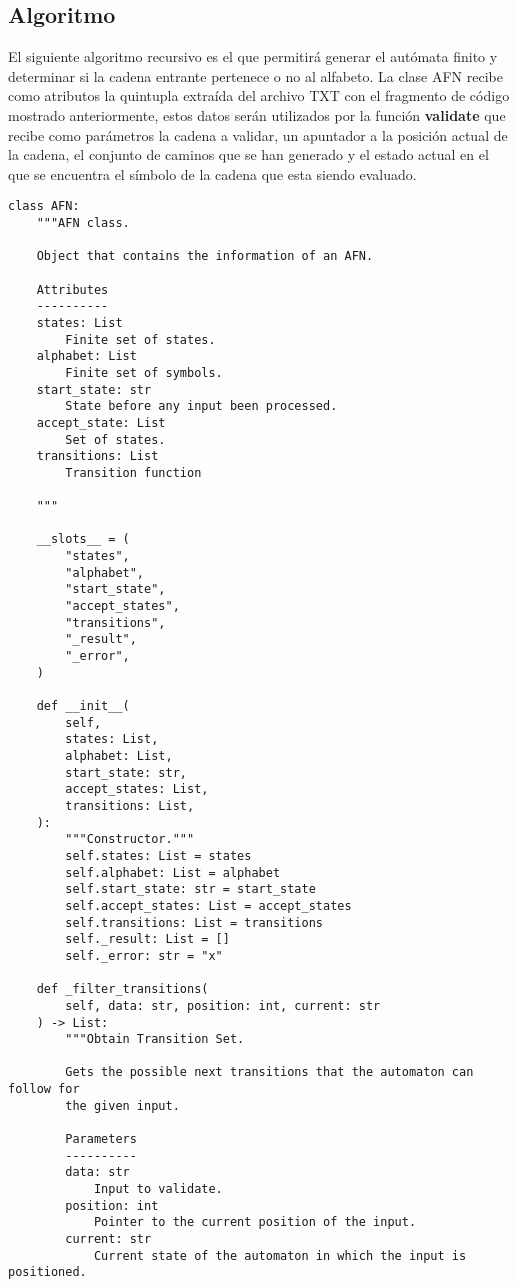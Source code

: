 \subsection{Algoritmo}

El siguiente algoritmo recursivo es el que permitirá generar el autómata finito y determinar si la cadena entrante pertenece o no al alfabeto. La clase AFN recibe como atributos la quintupla extraída del archivo TXT con el fragmento de código mostrado anteriormente, estos datos serán utilizados por la función \textbf{validate} que recibe como parámetros la cadena a validar, un apuntador a la posición actual de la cadena, el conjunto de caminos que se han generado y el estado actual en el que se encuentra el símbolo de la cadena que esta siendo evaluado.

\begin{lstlisting}
class AFN:
    """AFN class.

    Object that contains the information of an AFN.

    Attributes
    ----------
    states: List
        Finite set of states.
    alphabet: List
        Finite set of symbols.
    start_state: str
        State before any input been processed.
    accept_state: List
        Set of states.
    transitions: List
        Transition function

    """

    __slots__ = (
        "states",
        "alphabet",
        "start_state",
        "accept_states",
        "transitions",
        "_result",
        "_error",
    )

    def __init__(
        self,
        states: List,
        alphabet: List,
        start_state: str,
        accept_states: List,
        transitions: List,
    ):
        """Constructor."""
        self.states: List = states
        self.alphabet: List = alphabet
        self.start_state: str = start_state
        self.accept_states: List = accept_states
        self.transitions: List = transitions
        self._result: List = []
        self._error: str = "x"

    def _filter_transitions(
        self, data: str, position: int, current: str
    ) -> List:
        """Obtain Transition Set.

        Gets the possible next transitions that the automaton can follow for
        the given input.

        Parameters
        ----------
        data: str
            Input to validate.
        position: int
            Pointer to the current position of the input.
        current: str
            Current state of the automaton in which the input is positioned.


\end{lstlisting}
